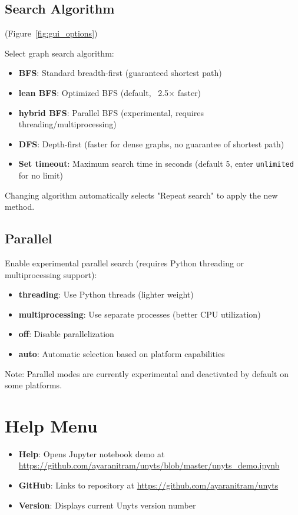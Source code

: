 \documentclass[11pt,a4paper]{report}
\begin{document}
\subsection{Search Algorithm} (Figure~\ref{fig:gui_options})

Select graph search algorithm:

\begin{itemize}
\item \textbf{BFS}: Standard breadth-first (guaranteed shortest path)
\item \textbf{lean BFS}: Optimized BFS (default, ~2.5× faster)
\item \textbf{hybrid BFS}: Parallel BFS (experimental, requires threading/multiprocessing)
\item \textbf{DFS}: Depth-first (faster for dense graphs, no guarantee of shortest path)
\item \textbf{Set timeout}: Maximum search time in seconds (default 5, enter \texttt{unlimited} for no limit)
\end{itemize}

Changing algorithm automatically selects "Repeat search" to apply the new method.

\subsection{Parallel}

Enable experimental parallel search (requires Python threading or multiprocessing support):

\begin{itemize}
\item \textbf{threading}: Use Python threads (lighter weight)
\item \textbf{multiprocessing}: Use separate processes (better CPU utilization)
\item \textbf{off}: Disable parallelization
\item \textbf{auto}: Automatic selection based on platform capabilities
\end{itemize}

Note: Parallel modes are currently experimental and deactivated by default on some platforms.

\section{Help Menu}

\begin{itemize}
\item \textbf{Help}: Opens Jupyter notebook demo at \url{https://github.com/ayaranitram/unyts/blob/master/unyts_demo.ipynb}
\item \textbf{GitHub}: Links to repository at \url{https://github.com/ayaranitram/unyts}
\item \textbf{Version}: Displays current Unyts version number
\end{itemize}
\end{document}
